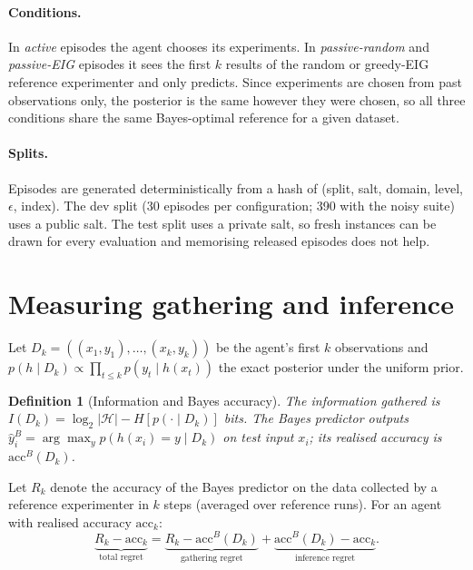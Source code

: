 \documentclass[11pt]{article}
\newtheorem{definition}{Definition}
\newcommand{\Hs}{\mathcal{H}}
\begin{document}
\paragraph{Conditions.} In \emph{active} episodes the agent chooses its experiments. In
\emph{passive-random} and \emph{passive-EIG} episodes it sees the first $k$ results of the random or
greedy-EIG reference experimenter and only predicts. Since experiments are chosen from past
observations only, the posterior is the same however they were chosen, so all three conditions share
the same Bayes-optimal reference for a given dataset.

\paragraph{Splits.} Episodes are generated deterministically from a hash of
(split, salt, domain, level, $\epsilon$, index). The dev split (30 episodes per configuration; 390 with
the noisy suite) uses a public salt. The test split uses a private salt, so fresh instances can be
drawn for every evaluation and memorising released episodes does not help.

\section{Measuring gathering and inference}\label{sec:metrics}

Let $D_k = ((x_1,y_1),\dots,(x_k,y_k))$ be the agent's first $k$ observations and
$p(h\mid D_k)\propto \prod_{t\le k} p(y_t\mid h(x_t))$ the exact posterior under the uniform prior.

\begin{definition}[Information and Bayes accuracy]
The information gathered is $I(D_k) = \log_2|\Hs| - H[p(\cdot\mid D_k)]$ bits. The Bayes predictor
outputs $\hat y^{B}_i = \arg\max_y p(h(x_i)=y\mid D_k)$ on test input $x_i$; its realised accuracy is
$\mathrm{acc}^B(D_k)$.
\end{definition}

Let $R_k$ denote the accuracy of the Bayes predictor on the data collected by a reference experimenter
in $k$ steps (averaged over reference runs). For an agent with realised accuracy $\mathrm{acc}_k$:
\begin{equation}\label{eq:decomp}
\underbrace{R_k - \mathrm{acc}_k}_{\text{total regret}}
= \underbrace{R_k - \mathrm{acc}^B(D_k)}_{\text{gathering regret}}
+ \underbrace{\mathrm{acc}^B(D_k) - \mathrm{acc}_k}_{\text{inference regret}} .
\end{equation}
\end{document}
